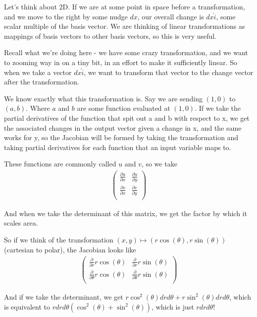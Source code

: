 \documentclass[12pt, letterpaper]{article}
\begin{document}
Let's think about 2D.
If we are at some point in space before a transformation, and we move to the right by some nudge $dx$,
our overall change is $dx\hat{i}$, some scalar multiple of the basis vector.
We are thinking of linear transformations as mappings of basis vectors to other basis vectors, so this is very useful.

Recall what we're doing here - we have some crazy transformation, and we want to zooming way in on a tiny bit, in an effort to make it sufficiently linear.
So when we take a vector $dx\hat{i}$, we want to transform that vector to the change vector after the transformation.

We know exactly what this transformation is. 
Say we are sending $(1, 0)$ to $(a, b)$.
Where $a$ and $b$ are some function evaluated at $(1, 0)$.
If we take the partial derivatives of the function that spit out a and b with respect to x, we get the associated changes in the output vector given a change in x,
and the same works for y, so the Jacobian will be formed by taking the transformation and taking partial derivatives for each function that an input variable maps to.

These functions are commonly called $u$ and $v$, so we take
\begin{gather*}
    \begin{pmatrix}
        \frac{\partial u}{\partial x} & \frac{\partial u}{\partial y}\\
        \frac{\partial v}{\partial x} & \frac{\partial v}{\partial y}\\
    \end{pmatrix}
\end{gather*}

And when we take the determinant of this matrix, we get the factor by which it scales area.

So if we think of the transformation $(x, y) \mapsto (r\cos(\theta), r\sin(\theta))$ (cartesian to polar),
the Jacobian looks like
\begin{gather*}
    \begin{pmatrix}
        \frac{\partial}{\partial r} r\cos(\theta) & \frac{\partial}{\partial r} r\sin(\theta)\\
        \frac{\partial}{\partial \theta} r\cos(\theta) & \frac{\partial}{\partial \theta} r\sin(\theta)\\
    \end{pmatrix}
\end{gather*}

And if we take the determinant, we get $r\cos^2(\theta)dr d\theta + r\sin^2(\theta)drd\theta$, which is equivalent to
$rdrd\theta(\cos^2(\theta) + \sin^2(\theta))$, which is just $rdrd\theta$!
\end{document}

